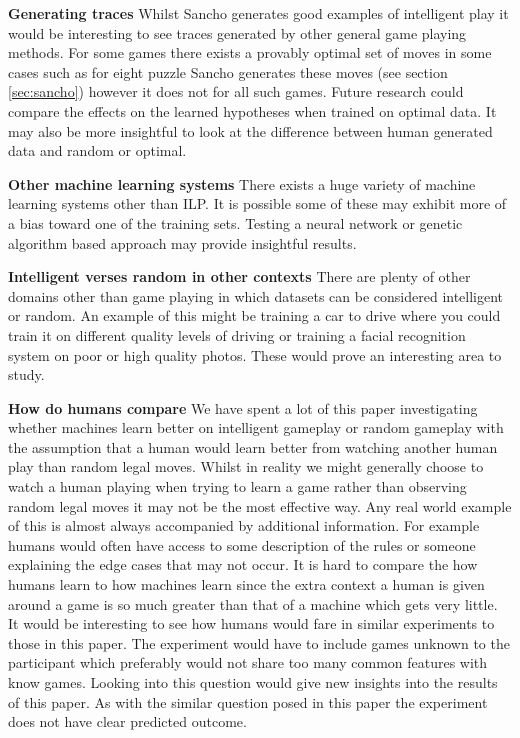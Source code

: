 \textbf{Generating traces} Whilst Sancho generates good examples of intelligent play it would be interesting to see traces generated by other general game playing methods\cite{Park/GGPAdvances,Kowalski/GGP}. For some games there exists a provably optimal set of moves in some cases such as for eight puzzle Sancho generates these moves (see section \ref{sec:sancho}) however it does not for all such games\cite{Schaeffer/Checkers}. Future research could compare the effects on the learned hypotheses when trained on optimal data. It may also be more insightful to look at the difference between human generated data and random or optimal.

\textbf{Other machine learning systems} There exists a huge variety of machine learning systems other than ILP. It is possible some of these may exhibit more of a bias toward one of the training sets. Testing a neural network or genetic algorithm based approach may provide insightful results.

\textbf{Intelligent verses random in other contexts} There are plenty of other domains other than game playing in which datasets can be considered intelligent or random. An example of this might be training a car to drive where you could train it on different quality levels of driving or training a facial recognition system on poor or high quality photos. These would prove an interesting area to study.

\textbf{How do humans compare} We have spent a lot of this paper investigating whether machines learn better on intelligent gameplay or random gameplay with the assumption that a human would learn better from watching another human play than random legal moves. Whilst in reality we might generally choose to watch a human playing when trying to learn a game rather than observing random legal moves it may not be the most effective way. Any real world example of this is almost always accompanied by additional information. For example humans would often have access to some description of the rules or someone explaining the edge cases that may not occur. It is hard to compare the how humans learn to how machines learn since the extra context a human is given around a game is so much greater than that of a machine which gets very little. It would be interesting to see how humans would fare in similar experiments to those in this paper. The experiment would have to include games unknown to the participant which preferably would not share too many common features with know games. Looking into this question would give new insights into the results of this paper. As with the similar question posed in this paper the experiment does not have clear predicted outcome.


